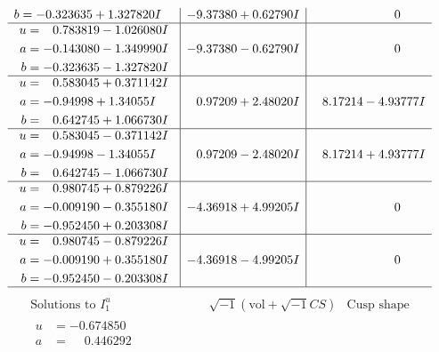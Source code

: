 \documentclass[1p]{elsarticle_modified}
\theoremstyle{definition}
\newcommand{\I}{\sqrt{-1}}
\begin{document}
$$\begin{array}{c|c|c}
\begin{aligned}
b &= -0.323635 + 1.327820 I\end{aligned}
 & -9.37380 + 0.62790 I & \phantom{-0.000000 } 0 \\ \hline\begin{aligned}
u &= \phantom{-}0.783819 - 1.026080 I \\
a &= -0.143080 - 1.349990 I \\
b &= -0.323635 - 1.327820 I\end{aligned}
 & -9.37380 - 0.62790 I & \phantom{-0.000000 } 0 \\ \hline\begin{aligned}
u &= \phantom{-}0.583045 + 0.371142 I \\
a &= -0.94998 + 1.34055 I \\
b &= \phantom{-}0.642745 + 1.066730 I\end{aligned}
 & \phantom{-}0.97209 + 2.48020 I & \phantom{-}8.17214 - 4.93777 I \\ \hline\begin{aligned}
u &= \phantom{-}0.583045 - 0.371142 I \\
a &= -0.94998 - 1.34055 I \\
b &= \phantom{-}0.642745 - 1.066730 I\end{aligned}
 & \phantom{-}0.97209 - 2.48020 I & \phantom{-}8.17214 + 4.93777 I \\ \hline\begin{aligned}
u &= \phantom{-}0.980745 + 0.879226 I \\
a &= -0.009190 - 0.355180 I \\
b &= -0.952450 + 0.203308 I\end{aligned}
 & -4.36918 + 4.99205 I & \phantom{-0.000000 } 0 \\ \hline\begin{aligned}
u &= \phantom{-}0.980745 - 0.879226 I \\
a &= -0.009190 + 0.355180 I \\
b &= -0.952450 - 0.203308 I\end{aligned}
 & -4.36918 - 4.99205 I & \phantom{-0.000000 } 0\\
 \hline 
 \end{array}$$\newpage$$\begin{array}{c|c|c}  
\text{Solutions to }I^u_{1}& \I (\text{vol} + \sqrt{-1}CS) & \text{Cusp shape}\\
 \hline 
\begin{aligned}
u &= -0.674850\phantom{ +0.000000I} \\
a &= \phantom{-}0.446292\phantom{ +0.000000I} \\

\end{aligned}
\end{array}$$
\end{document}
